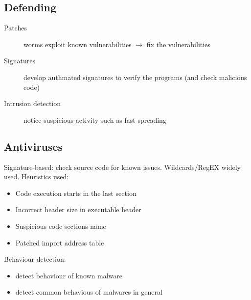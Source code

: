 \documentclass{article}
\begin{document}
\subsection{Defending}
\begin{description}
\item[Patches] worms exploit known vulnerabilities $\rightarrow$ fix the vulnerabilities
\item[Signatures] develop authmated signatures to verify the programs (and check malicious code)
\item[Intrusion detection] notice suspicious activity such as fast spreading
\end{description}
\subsection{Antiviruses}
Signature-based: check source code for known issues. Wildcards/RegEX widely used. Heuristics used:
\begin{itemize}
\item Code execution starts in the last section
\item Incorrect header size in executable header
\item Suspicious code sections name
\item Patched import address table
\end{itemize}
Behaviour detection:
\begin{itemize}
\item detect behaviour of known malware
\item detect common behavious of malwares in general
\end{itemize}
\end{document}
